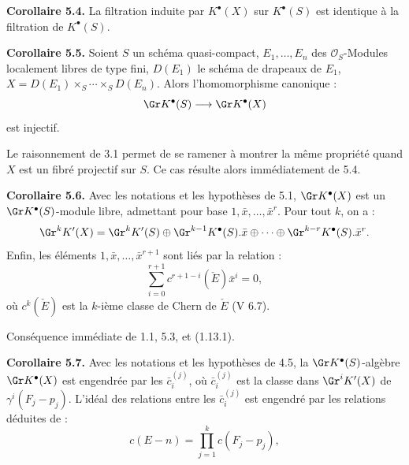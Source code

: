 \textbf{Corollaire 5.4.} La filtration induite par $K^{\bullet}(X)$ sur $K^{\bullet}(S)$ est identique à la filtration de $K^{\bullet}(S)$.

\textbf{Corollaire 5.5.} Soient $S$ un schéma quasi-compact, $E_1,\ldots,E_n$ des $\mathcal O_S$-Modules localement libres de type fini, $D(E_1)$ le schéma de drapeaux de $E_1$, $X=D(E_1)\times_S\cdots\times_S D(E_n)$. Alors l'homomorphisme canonique :
\[
  \Gr K^{\bullet}(S)\longrightarrow \Gr K^{\bullet}(X)
\]
est injectif.

Le raisonnement de 3.1 permet de se ramener à montrer la même propriété quand $X$ est un fibré projectif sur $S$. Ce cas résulte alors immédiatement de 5.4.

\textbf{Corollaire 5.6.} Avec les notations et les hypothèses de 5.1, $\Gr K^{\bullet}(X)$ est un $\Gr K^{\bullet}(S)$-module libre, admettant pour base $1,\bar x,\ldots,\bar x^r$. Pour tout $k$, on a :
\[
  \Gr^kK'(X)=\Gr^kK'(S)\oplus \Gr^{k-1}K^{\bullet}(S).\bar x\oplus\cdots\oplus \Gr^{k-r}K^{\bullet}(S).\bar x^r .
\]
Enfin, les éléments $1,\bar x,\ldots,\bar x^{r+1}$ sont liés par la relation :
\[
  \sum_{i=0}^{r+1}c^{r+1-i}(\check E)\bar x^i=0,
\]
où $c^k(\check E)$ est la $k$-ième classe de Chern de $\check E$ (V 6.7).

Conséquence immédiate de 1.1, 5.3, et (1.13.1).

\textbf{Corollaire 5.7.} Avec les notations et les hypothèses de 4.5, la $\Gr K^{\bullet}(S)$-algèbre $\Gr K^{\bullet}(X)$ est engendrée par les $\bar c_i^{(j)}$, où $\bar c_i^{(j)}$ est la classe dans $\Gr^iK'(X)$ de $\gamma^i(F_j-p_j)$. L'idéal des relations entre les $\bar c_i^{(j)}$ est engendré par les relations déduites de :
\[
  c(E-n)=\prod_{j=1}^{k}c(F_j-p_j),
\]
